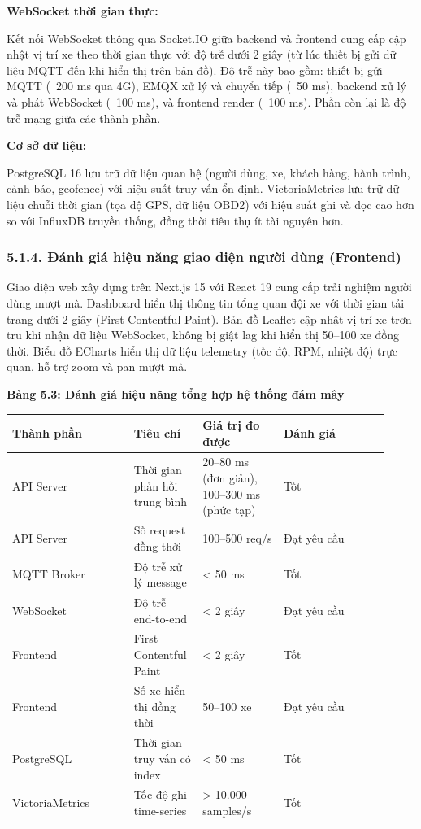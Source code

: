 \documentclass[13pt,a4paper]{extarticle}
\newcounter{none} %
\newcommand{\thesislongtableorignewline}{}
\let\thesislongtableorignewline\\
\renewcommand{\\}{\thesislongtableorignewline\hline}%
\let\\\thesislongtableorignewline
\newcommand{\thesistabletitle}[1]{%
  \begin{center}\textbf{#1}\end{center}%
}
\begin{document}
\textbf{WebSocket thời gian thực:}

Kết nối WebSocket thông qua Socket.IO giữa backend và frontend cung cấp
cập nhật vị trí xe theo thời gian thực với độ trễ dưới 2 giây (từ lúc
thiết bị gửi dữ liệu MQTT đến khi hiển thị trên bản đồ). Độ trễ này bao
gồm: thiết bị gửi MQTT (~200 ms qua 4G), EMQX xử lý và
chuyển tiếp (~50 ms), backend xử lý và phát WebSocket
(~100 ms), và frontend render (~100 ms).
Phần còn lại là độ trễ mạng giữa các thành phần.

\textbf{Cơ sở dữ liệu:}

PostgreSQL 16 lưu trữ dữ liệu quan hệ (người dùng, xe, khách hàng, hành
trình, cảnh báo, geofence) với hiệu suất truy vấn ổn định.
VictoriaMetrics lưu trữ dữ liệu chuỗi thời gian (tọa độ GPS, dữ liệu
OBD2) với hiệu suất ghi và đọc cao hơn so với InfluxDB truyền thống,
đồng thời tiêu thụ ít tài nguyên hơn.

\subsubsection{5.1.4. Đánh giá hiệu năng giao diện người dùng
(Frontend)}\label{514-ux111uxe1nh-giuxe1-hiux1ec7u-nux103ng-giao-diux1ec7n-ngux1b0ux1eddi-duxf9ng-frontend}

Giao diện web xây dựng trên Next.js 15 với React 19 cung cấp trải nghiệm
người dùng mượt mà. Dashboard hiển thị thông tin tổng quan đội xe với
thời gian tải trang dưới 2 giây (First Contentful Paint). Bản đồ Leaflet
cập nhật vị trí xe trơn tru khi nhận dữ liệu WebSocket, không bị giật
lag khi hiển thị 50--100 xe đồng thời. Biểu đồ ECharts hiển thị dữ liệu
telemetry (tốc độ, RPM, nhiệt độ) trực quan, hỗ trợ zoom và pan mượt mà.

\thesistabletitle{Bảng 5.3: Đánh giá hiệu năng tổng hợp hệ thống đám mây}

{\def\LTcaptype{none} %
\begin{longtable}{|p{0.30\linewidth}|p{0.16\linewidth}|p{0.20\linewidth}|p{0.26\linewidth}|}
\hline \textbf{Thành phần} & \textbf{Tiêu chí} & \textbf{Giá trị đo được} & \textbf{Đánh giá} \\
\hline
\endhead
\hline
\endlastfoot
API Server & Thời gian phản hồi trung bình & 20--80 ms (đơn giản),
100--300 ms (phức tạp) & Tốt \\
API Server & Số request đồng thời & 100--500 req/s & Đạt yêu cầu \\
MQTT Broker & Độ trễ xử lý message & \textless{} 50 ms & Tốt \\
WebSocket & Độ trễ end-to-end & \textless{} 2 giây & Đạt yêu cầu \\
Frontend & First Contentful Paint & \textless{} 2 giây & Tốt \\
Frontend & Số xe hiển thị đồng thời & 50--100 xe & Đạt yêu cầu \\
PostgreSQL & Thời gian truy vấn có index & \textless{} 50 ms & Tốt \\
VictoriaMetrics & Tốc độ ghi time-series & \textgreater{} 10.000
samples/s & Tốt \\
\end{longtable}
}
\end{document}
